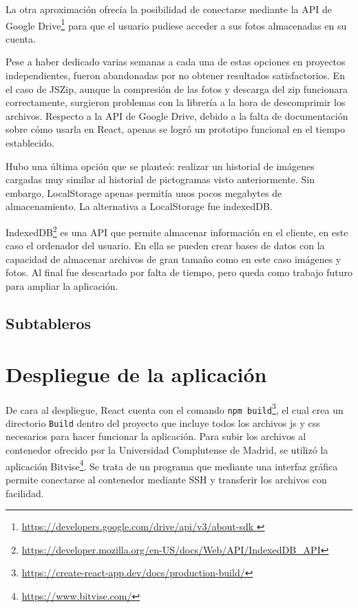La otra aproximación ofrecía la posibilidad de conectarse mediante la API de Google Drive\footnote{\url{https://developers.google.com/drive/api/v3/about-sdk }} para que el usuario pudiese acceder a sus fotos almacenadas en su cuenta. 

Pese a haber dedicado varias semanas a cada una de estas opciones en proyectos independientes, fueron abandonadas por no obtener resultados satisfactorios. En el caso de JSZip, aunque la compresión de las fotos y descarga del zip funcionara correctamente, surgieron problemas con la librería a la hora de descomprimir los archivos. Respecto a la API de Google Drive, debido a la falta de documentación sobre cómo usarla en React, apenas se logró un prototipo funcional en el tiempo establecido. 

Hubo una última opción que se planteó: realizar un historial de imágenes cargadas muy similar al historial de pictogramas visto anteriormente. Sin embargo, LocalStorage apenas permitía unos pocos megabytes de almacenamiento. La alternativa a LocalStorage fue indexedDB. 

IndexedDB\footnote{\url{https://developer.mozilla.org/en-US/docs/Web/API/IndexedDB_API}}   es una API que permite almacenar información en el cliente, en este caso el ordenador del usuario. En ella se pueden crear bases de datos con la capacidad de almacenar archivos de gran tamaño como en este caso imágenes y fotos. Al final fue descartado por falta de tiempo, pero queda como trabajo futuro para ampliar la aplicación.


\subsection{Subtableros}

\section{Despliegue de la aplicación}

De cara al despliegue, React cuenta con el comando \texttt{npm build}\footnote{\url{https://create-react-app.dev/docs/production-build/}}, el cual crea un directorio \texttt{Build} dentro del proyecto que incluye todos los archivos js y css necesarios para hacer funcionar la aplicación. Para subir los archivos al contenedor ofrecido por la Universidad Complutense de Madrid, se utilizó la aplicación Bitvise\footnote{\url{https://www.bitvise.com/}}. Se trata de un programa que mediante una interfaz gráfica permite conectarse al contenedor mediante SSH y transferir los archivos con facilidad. 

